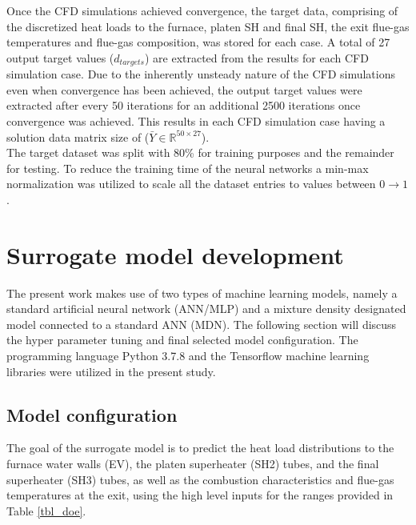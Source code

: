 \documentclass[a4paper,fleqn]{cas-sc}
\begin{document}
Once the CFD simulations achieved convergence, the target data, comprising of the discretized heat loads to the furnace, platen SH and final SH, the exit flue-gas temperatures and flue-gas composition, was stored for each case. A total of 27 output target values ($d_{targets}$) are extracted from the results for each CFD simulation case. Due to the inherently unsteady nature of the CFD simulations even when convergence has been achieved, the output target values were extracted after every 50 iterations for an additional 2500 iterations once convergence was achieved. This results in each CFD simulation case having a solution data matrix size of ($\bar{Y}\in \mathbb{R}^{50\times27}$).\\

The target dataset was split with 80\% for training purposes and the remainder for testing. To reduce the training time of the neural networks a min-max normalization was utilized to scale all the dataset entries to values between $0\rightarrow1$.
\section{Surrogate model development}
The present work makes use of two types of machine learning models, namely a standard artificial neural network (ANN/MLP) and a mixture density designated model connected to a standard ANN (MDN). The following section will discuss the hyper parameter tuning and final selected model configuration. The programming language Python 3.7.8 and the Tensorflow machine learning libraries were utilized in the present study.
\newpage
\subsection{Model configuration}
The goal of the surrogate model is to predict the heat load distributions to the furnace water walls (EV), the platen superheater (SH2) tubes, and the final superheater (SH3) tubes, as well as the combustion characteristics and flue-gas temperatures at the exit, using the high level inputs for the ranges provided in Table \ref{tbl_doe}.\\
\end{document}
